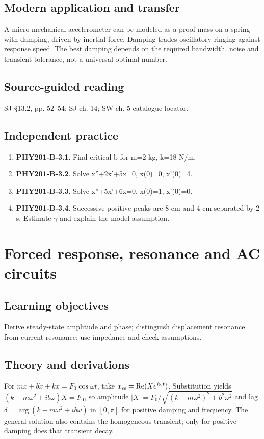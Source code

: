 \documentclass[11pt,a4paper,openany]{book}
\begin{document}
\section{Modern application and transfer}
A micro-mechanical accelerometer can be modeled as a proof mass on a spring with damping, driven by inertial force. Damping trades oscillatory ringing against response speed. The best damping depends on the required bandwidth, noise and transient tolerance, not a universal optimal number.
\section{Source-guided reading}
SJ §13.2, pp. 52–54; SJ ch. 14; SW ch. 5 catalogue locator.
\section{Independent practice}
\begin{enumerate}
\item \textbf{PHY201-B-3.1}. Find critical b for m=2 kg, k=18 N/m.
\item \textbf{PHY201-B-3.2}. Solve x''+2x'+5x=0, x(0)=0, x'(0)=4.
\item \textbf{PHY201-B-3.3}. Solve x''+5x'+6x=0, x(0)=1, x'(0)=0.
\item \textbf{PHY201-B-3.4}. Successive positive peaks are 8 cm and 4 cm separated by 2 s. Estimate \ensuremath{\gamma} and explain the model assumption.
\end{enumerate}
\chapter{Forced response, resonance and AC circuits}
\section{Learning objectives}
Derive steady-state amplitude and phase; distinguish displacement resonance from current resonance; use impedance and check assumptions.
\section{Theory and derivations}
For $m\ddot x+b\dot x+kx=F_0\cos\omega t$, take $x_{\rm ss}=\operatorname{Re}(Xe^{i\omega t})$. Substitution yields $(k-m\omega^2+ib\omega)X=F_0$, so amplitude $|X|=F_0/\sqrt{(k-m\omega^2)^2+b^2\omega^2}$ and lag $\delta=\arg(k-m\omega^2+ib\omega)$ in $[0,\pi]$ for positive damping and frequency. The general solution also contains the homogeneous transient; only for positive damping does that transient decay.
\end{document}
